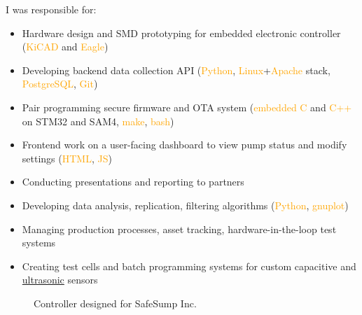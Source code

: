 \documentclass[fleqn,11pt]{article}
\newcommand{\sk}[1]{\textcolor{orange}{#1}}
\newcommand{\itemoptions}{\setlength{\itemindent}{-10pt} \setlength\itemsep{-1em}}
\begin{document}
I was responsible for:
\begin{itemize}\itemoptions
\item Hardware design and SMD prototyping for embedded electronic controller (\sk{KiCAD} and \sk{Eagle})
\item Developing backend data collection API (\sk{Python}, \sk{Linux}+\sk{Apache} stack, \sk{PostgreSQL}, \sk{Git}) %
\item Pair programming secure firmware and OTA system (\sk{embedded C} and \sk{C++} on STM32 and SAM4, \sk{make}, \sk{bash})
\item Frontend work on a user-facing dashboard to view pump status and modify settings (\sk{HTML}, \sk{JS})
\item Conducting presentations and reporting to partners
\item Developing data analysis, replication, filtering algorithms (\sk{Python}, \sk{gnuplot})
\item Managing production processes, asset tracking, hardware-in-the-loop test systems
\item Creating test cells and batch programming systems for custom capacitive and \href{https://github.com/0xDBFB7/UltimateUltrasonicAmplifier}{ultrasonic} sensors
\end{itemize}


\begin{figure}[H]
	\centering
	\captionsetup{labelformat=empty}
	
	\caption*{Controller designed for SafeSump Inc.}
	\hfill
\end{figure}

\end{document}

